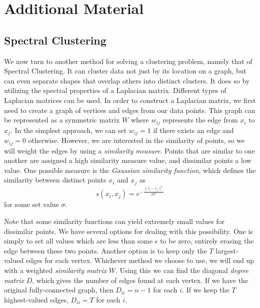 \newpage

\section*{Additional Material} %

\subsection*{Spectral Clustering}
We now turn to another method for solving a clustering problem, namely that of Spectral Clustering. 
It can cluster data not just by its location on a graph, but can even separate shapes that overlap others into distinct clusters. 
It does so by utilizing the spectral properties of a Laplacian matrix. 
Different types of Laplacian matrices can be used. 
In order to construct a Laplacian matrix, we first need to create a graph of vertices and edges from our data points. 
This graph can be represented as a symmetric matrix $W$ where $w_{ij}$ represents the edge from $x_i$ to $x_j$. 
In the simplest approach, we can set $w_{ij} = 1$ if there exists an edge and $w_{ij} = 0$ otherwise. 
However, we are interested in the similarity of points, so we will weight the edges by using a \emph{similarity measure}. 
Points that are similar to one another are assigned a high similarity measure value, and dissimilar points a low value. 
One possible measure is the \emph{Gaussian similarity function}, which defines the similarity between distinct points $x_i$ and $x_j$ as
\begin{equation*}
s(x_i,x_j) = e^{- \frac{\| x_i - x_j \| ^2}{2 \sigma ^2}}
\end{equation*}
for some set value $\sigma$.

Note that some similarity functions can yield extremely small values for dissimilar points. 
We have several options for dealing with this possibility. 
One is simply to set all values which are less than some $\epsilon$ to be zero, entirely erasing the edge between these two points. 
Another option is to keep only the $T$ largest-valued edges for each vertex. 
Whichever method we choose to use, we will end up with a weighted \emph{similarity matrix} $W$. 
Using this we can find the diagonal \emph{degree matrix} $D$, which gives the number of edges found at each vertex. 
If we have the original fully-connected graph, then $D_{ii} = n-1$ for each $i$. 
If we keep the $T$ highest-valued edges, $D_{ii} = T$ for each $i$.

